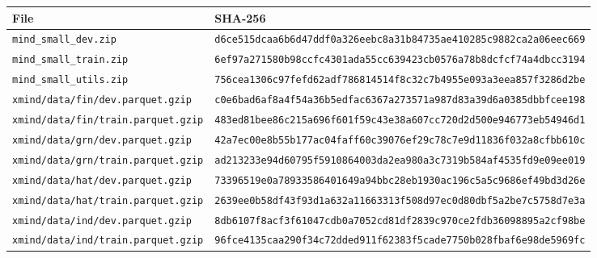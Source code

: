 \begin{longtable}{p{5.0cm}p{9.5cm}}
\toprule
File & SHA-256\\
\midrule
\endhead
\bottomrule
\endfoot
\texttt{\scriptsize mind\_small\_dev.zip} & \texttt{\scriptsize d6ce515dcaa6b6d47ddf0a326eebc8a3\hspace{0pt}1b84735ae410285c9882ca2a06eec669}\\
\texttt{\scriptsize mind\_small\_train.zip} & \texttt{\scriptsize 6ef97a271580b98ccfc4301ada55cc63\hspace{0pt}9423cb0576a78b8dcfcf74a4dbcc3194}\\
\texttt{\scriptsize mind\_small\_utils.zip} & \texttt{\scriptsize 756cea1306c97fefd62adf786814514f\hspace{0pt}8c32c7b4955e093a3eea857f3286d2be}\\
\texttt{\scriptsize xmind/data/fin/dev.parquet.gzip} & \texttt{\scriptsize c0e6bad6af8a4f54a36b5edfac6367a2\hspace{0pt}73571a987d83a39d6a0385dbbfcee198}\\
\texttt{\scriptsize xmind/data/fin/train.parquet.gzip} & \texttt{\scriptsize 483ed81bee86c215a696f601f59c43e3\hspace{0pt}8a607cc720d2d500e946773eb54946d1}\\
\texttt{\scriptsize xmind/data/grn/dev.parquet.gzip} & \texttt{\scriptsize 42a7ec00e8b55b177ac04faff60c3907\hspace{0pt}6ef29c78c7e9d11836f032a8cfbb610c}\\
\texttt{\scriptsize xmind/data/grn/train.parquet.gzip} & \texttt{\scriptsize ad213233e94d60795f5910864003da2e\hspace{0pt}a980a3c7319b584af4535fd9e09ee019}\\
\texttt{\scriptsize xmind/data/hat/dev.parquet.gzip} & \texttt{\scriptsize 73396519e0a78933586401649a94bbc2\hspace{0pt}8eb1930ac196c5a5c9686ef49bd3d26e}\\
\texttt{\scriptsize xmind/data/hat/train.parquet.gzip} & \texttt{\scriptsize 2639ee0b58df43f93d1a632a11663313\hspace{0pt}f508d97ec0d80dbf5a2be7c5758d7e3a}\\
\texttt{\scriptsize xmind/data/ind/dev.parquet.gzip} & \texttt{\scriptsize 8db6107f8acf3f61047cdb0a7052cd81\hspace{0pt}df2839c970ce2fdb36098895a2cf98be}\\
\texttt{\scriptsize xmind/data/ind/train.parquet.gzip} & \texttt{\scriptsize 96fce4135caa290f34c72dded911f623\hspace{0pt}83f5cade7750b028fbaf6e98de5969fc}\\

\end{longtable}
